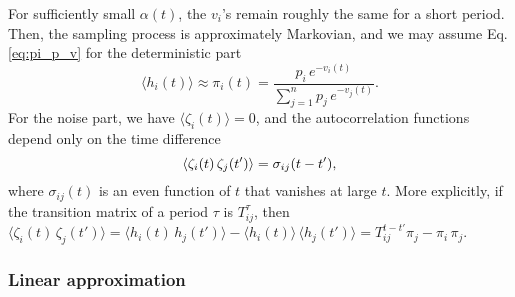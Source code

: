 \documentclass[reprint, floatfix]{revtex4-1}
\begin{document}
For sufficiently small $\alpha(t)$,
the $v_i$'s remain roughly the same for a short period.
%
Then,
the sampling process is approximately Markovian, %
and we may assume Eq. \eqref{eq:pi_p_v}
for the deterministic part
%
\begin{equation}
  \langle h_i(t) \rangle
  \approx
  \pi_i(t)
  =
  \frac{                p_i \, e^{-v_i(t)} }
       { \sum_{j = 1}^n p_j \, e^{-v_j(t)} }.
  \label{eq:h_ave}
\end{equation}
%
%
%
For the noise part, we have
$\langle \zeta_i(t) \rangle = 0$,
%
and the autocorrelation functions
depend only on the time difference
%
\begin{equation}
  \langle \zeta_i(t) \, \zeta_j(t') \rangle
  =
  \sigma_{ij}(t - t'),
  \notag
\end{equation}
%
where $\sigma_{ij}(t)$ is an even function of $t$
that vanishes at large $t$.
%
More explicitly,
if the transition matrix of a period $\tau$
is $T^\tau_{ij}$,
then
$
  \langle \zeta_i(t) \, \zeta_j(t') \rangle
  =
  \langle h_i(t) \, h_j(t') \rangle
  -
  \langle h_i(t) \rangle \, \langle h_j(t') \rangle
  =
  T^{t - t'}_{ij} \pi_j - \pi_i \, \pi_j.
$




\subsubsection{Linear approximation}
\end{document}
